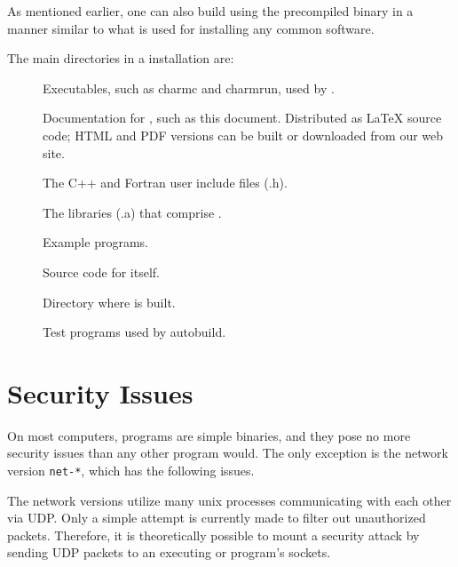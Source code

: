 As mentioned earlier, one can also build \charmpp{} using the precompiled binary
in a manner similar to what is used for installing any common software.


The main directories in a \charmpp{} installation are:

\begin{description}
\item[]
Executables, such as charmc and charmrun,
used by \charmpp{}.

\item[]
Documentation for \charmpp{}, such as this
document.  Distributed as LaTeX source code; HTML and PDF versions
can be built or downloaded from our web site.

\item[]
The \charmpp{} C++ and Fortran user include files (.h).

\item[]
The libraries (.a) that comprise \charmpp{}.

\item[]
Example \charmpp{} programs.

\item[]
Source code for \charmpp{} itself.

\item[]
Directory where \charmpp{} is built.


\item[]
Test \charmpp{} programs used by autobuild.

\end{description}

\section{Security Issues}

On most computers, \charmpp{} programs are simple binaries, and they pose
no more security issues than any other program would.  The only exception
is the network version {\tt net-*}, which has the following issues. 

The network versions utilize many unix processes communicating with
each other via UDP.  Only a simple attempt is currently made to filter out
unauthorized packets.  Therefore, it is theoretically possible to
mount a security attack by sending UDP packets to an executing
\converse{} or \charmpp{} program's sockets.

